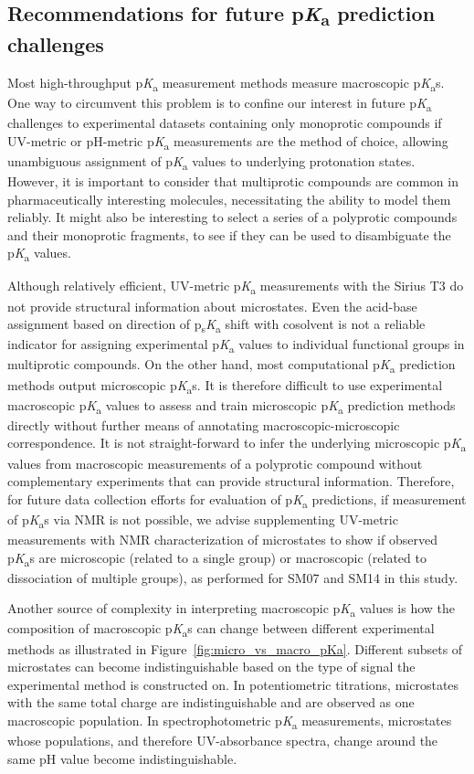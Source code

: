 \documentclass[9pt,lineno]{elife}
\newcommand{\pKa}{p\textit{K}\textsubscript{a}}
\newcommand{\psKa}{p\textsubscript{s}\textit{K}\textsubscript{a}}
\begin{document}
\subsection{Recommendations for future \pKa{} prediction challenges}

Most high-throughput \pKa{} measurement methods measure macroscopic \pKa{}s. 
One way to circumvent this problem is to confine our interest in future \pKa{} challenges to experimental datasets containing only monoprotic compounds if UV-metric or pH-metric \pKa{} measurements are the method of choice, allowing unambiguous assignment of  \pKa{} values to underlying protonation states. 
However, it is important to consider that multiprotic compounds are common in pharmaceutically interesting molecules, necessitating the ability to model them reliably. 
It might also be interesting to select a series of a polyprotic compounds and their monoprotic fragments, to see if they can be used to disambiguate the \pKa{} values.

Although relatively efficient, UV-metric \pKa{} measurements with the Sirius T3 do not provide structural information about microstates. 
Even the acid-base assignment based on direction of \psKa{} shift with cosolvent is not a reliable indicator for assigning experimental \pKa{} values to individual functional groups in multiprotic compounds. 
On the other hand, most computational \pKa{} prediction methods output microscopic \pKa{}s. 
It is therefore difficult to use experimental macroscopic \pKa{} values to assess and train microscopic \pKa{} prediction methods directly without further means of annotating macroscopic-microscopic correspondence. 
It is not straight-forward to infer the underlying microscopic \pKa{} values from macroscopic measurements of a polyprotic compound without complementary experiments that can provide structural information. Therefore, for future data collection efforts for evaluation of \pKa{} predictions, if measurement of \pKa{}s via NMR is not possible, we advise supplementing UV-metric measurements with NMR characterization of microstates to show if observed \pKa{}s are microscopic (related to a single group) or macroscopic (related to dissociation of multiple groups), as performed for SM07 and SM14 in this study. 

Another source of complexity in interpreting macroscopic \pKa{} values is how the composition of macroscopic \pKa{}s can change between different experimental methods as illustrated in Figure~\ref{fig:micro_vs_macro_pKa}. Different subsets of microstates can become indistinguishable based on the type of signal the experimental method is constructed on. In potentiometric titrations, microstates with the same total charge are indistinguishable and are observed as one macroscopic population. In spectrophotometric \pKa{} measurements, microstates whose populations, and therefore UV-absorbance spectra, change around the same pH value become indistinguishable.   
\end{document}
